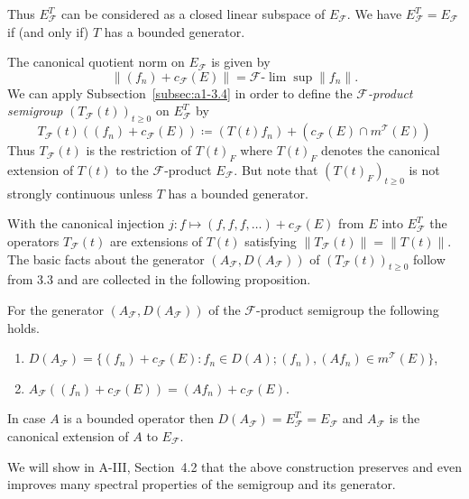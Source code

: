 Thus $E_{\mathcal{F}}^{T}$ can be considered as a closed linear subspace of $E_{\mathcal{F}}$. 
We have $E_{\mathcal{F}}^{T} = E_{\mathcal{F}}$ if (and only if) $T$ has a bounded generator.

The canonical quotient norm on $E_{\mathcal{F}}$ is given by
\[
    \|(f_{n}) + c_{\mathcal{F}}(E)\| = \mathcal{F}\text{-}\lim \sup \|f_{n}\| .
\]
We can apply Subsection~\ref{subsec:a1-3.4} in order to define the \emph{$\mathcal{F}$-product semigroup} $(T_{\mathcal{F}}(t))_{t \geq 0}$ on $E_{\mathcal{F}}^{T}$ by
\[
    T_{\mathcal{F}}(t)((f_{n}) + c_{\mathcal{F}}(E)) \coloneqq (T(t)f_{n}) 
    	+ ( c_{\mathcal{F}}(E)\cap m^{\mathcal{T}}(E) )
\]
Thus $T_{\mathcal{F}}(t)$ is the restriction of $T(t)_{F}$ where $T(t)_{F}$ denotes the canonical extension of $T(t)$ to the $\mathcal{F}$-product $E_{\mathcal{F}}$. 
But note that $(T(t)_{F})_{t \geq 0}$ is not strongly continuous unless $T$ has a bounded generator.

With the canonical injection $j \colon f \mapsto (f,f,f,\ldots) + c_{\mathcal{F}}(E)$ from $E$ into $E_{\mathcal{F}}^{T}$ the operators $T_{\mathcal{F}}(t)$ are extensions of $T(t)$ satisfying $\|T_{\mathcal{F}}(t)\| = \|T(t)\|$. The basic facts about the generator $(A_{\mathcal{F}},D(A_{\mathcal{F}}))$ of $(T_{\mathcal{F}}(t))_{t \geq 0}$ follow from 3.3 and are collected in the following proposition.
\begin{proposition*}\label{prop:a1-3.6}
For the generator $(A_{\mathcal{F}},D(A_{\mathcal{F}}))$ of the $\mathcal{F}$-product semigroup the following holds.
\begin{enumerate}[\upshape(i)]
\item 
$D(A_{\mathcal{F}}) = \{(f_{n}) + c_{\mathcal{F}}(E) \colon f_{n} \in D(A); (f_{n}), (Af_{n}) \in m^{\mathcal{T}}(E)\}$,

\item 
$A_{\mathcal{F}}((f_{n}) + c_{\mathcal{F}}(E)) = (Af_{n}) + c_{\mathcal{F}}(E)$.

\end{enumerate}
\end{proposition*}
In case $A$ is a bounded operator then $D(A_{\mathcal{F}}) = E_{\mathcal{F}}^{T} = E_{\mathcal{F}}$ and $A_{\mathcal{F}}$ is the canonical extension of $A$ to $E_{\mathcal{F}}$.

We will show in A-III, Section~4.2 that the above construction preserves and even improves many spectral properties of the semigroup and its generator.

